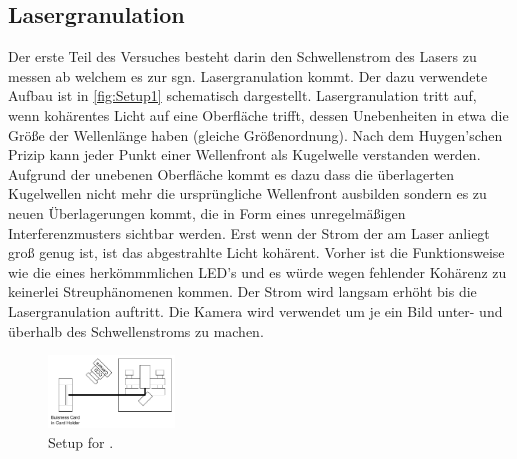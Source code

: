 \subsection{Lasergranulation}
\label{sec:AufbLasergran}
Der erste Teil des Versuches besteht darin den Schwellenstrom des Lasers zu messen ab welchem es zur sgn. Lasergranulation kommt.
Der dazu verwendete Aufbau ist in \autoref{fig:Setup1} schematisch dargestellt.
Lasergranulation tritt auf, wenn kohärentes Licht auf eine Oberfläche trifft, dessen Unebenheiten in etwa die Größe der Wellenlänge haben (gleiche Größenordnung).
Nach dem Huygen'schen Prizip kann jeder Punkt einer Wellenfront als Kugelwelle verstanden werden. Aufgrund der unebenen Oberfläche kommt es dazu dass die überlagerten Kugelwellen
nicht mehr die ursprüngliche Wellenfront ausbilden sondern es zu neuen Überlagerungen kommt, die in Form eines unregelmäßigen Interferenzmusters sichtbar werden.
Erst wenn der Strom der am Laser anliegt groß genug ist, ist das abgestrahlte Licht kohärent. Vorher ist die Funktionsweise wie die eines herkömmmlichen LED's und es würde wegen fehlender 
Kohärenz zu keinerlei Streuphänomenen kommen.
Der Strom wird langsam erhöht bis die Lasergranulation auftritt.
Die Kamera wird verwendet um je ein Bild unter- und überhalb des Schwellenstroms zu machen.
\begin{figure}
    \begin{center}
        \includegraphics[width=0.3\textwidth]{Setup1.pdf}
        \caption{Setup for \cite{ap60}.}
        \label{fig:Setup1}
    \end{center} 
\end{figure}


